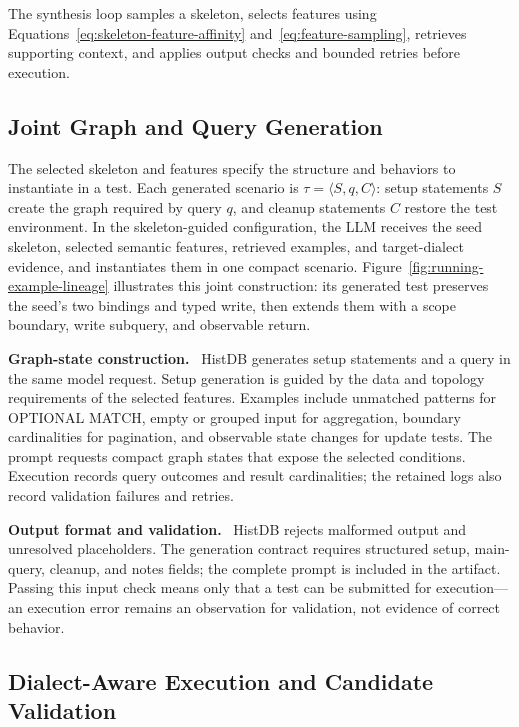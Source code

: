 \documentclass[acmsmall,screen,anonymous]{acmart}
\newcommand{\cnpara}[1]{\par\noindent\textbf{#1.}\ }
\begin{document}
The synthesis loop samples a skeleton, selects features using Equations~\ref{eq:skeleton-feature-affinity} and~\ref{eq:feature-sampling}, retrieves supporting context, and applies output checks and bounded retries before execution.

\subsection{Joint Graph and Query Generation}
\label{sec:joint-generation}

The selected skeleton and features specify the structure and behaviors to instantiate in a test. Each generated scenario is $\tau=\langle S,q,C\rangle$: setup statements $S$ create the graph required by query $q$, and cleanup statements $C$ restore the test environment. In the skeleton-guided configuration, the LLM receives the seed skeleton, selected semantic features, retrieved examples, and target-dialect evidence, and instantiates them in one compact scenario. Figure~\ref{fig:running-example-lineage} illustrates this joint construction: its generated test preserves the seed's two bindings and typed write, then extends them with a scope boundary, write subquery, and observable return.

\cnpara{Graph-state construction}
HistDB generates setup statements and a query in the same model request. Setup generation is guided by the data and topology requirements of the selected features. Examples include unmatched patterns for OPTIONAL MATCH, empty or grouped input for aggregation, boundary cardinalities for pagination, and observable state changes for update tests. The prompt requests compact graph states that expose the selected conditions. Execution records query outcomes and result cardinalities; the retained logs also record validation failures and retries.

\cnpara{Output format and validation}
HistDB rejects malformed output and unresolved placeholders. The generation contract requires structured setup, main-query, cleanup, and notes fields; the complete prompt is included in the artifact. Passing this input check means only that a test can be submitted for execution---an execution error remains an observation for validation, not evidence of correct behavior.

\subsection{Dialect-Aware Execution and Candidate Validation}
\label{sec:execution-validation}
\end{document}
